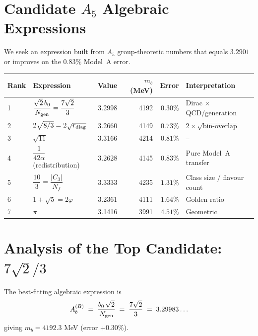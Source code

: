 \documentclass[11pt]{article}
\begin{document}
\section{Candidate $A_5$ Algebraic Expressions}

We seek an expression built from $A_5$ group-theoretic numbers that
equals $3.2901$ or improves on the $0.83\%$ Model~A error.

\medskip
\begin{center}
\begin{tabular}{llrrrl}
\toprule
Rank & Expression & Value & $m_b$ (MeV) & Error & Interpretation \\
\midrule
1 & $\dfrac{\sqrt{2}\,b_0}{N_{\rm gen}} = \dfrac{7\sqrt{2}}{3}$
  & 3.2998 & 4192 & $0.30\%$ & Dirac $\times$ QCD/generation \\[8pt]
2 & $2\sqrt{8/3} = 2\sqrt{r_{\rm diag}}$
  & 3.2660 & 4149 & $0.73\%$ & $2\times\sqrt{\text{bin-overlap}}$ \\[4pt]
3 & $\sqrt{11}$
  & 3.3166 & 4214 & $0.81\%$ & -- \\[2pt]
4 & $\dfrac{1}{42\alpha}$ (redistribution)
  & 3.2628 & 4145 & $0.83\%$ & Pure Model~A transfer \\[4pt]
5 & $\dfrac{10}{3} = \dfrac{|C_3|}{N_f}$
  & 3.3333 & 4235 & $1.31\%$ & Class size / flavour count \\[4pt]
6 & $1 + \sqrt{5} = 2\varphi$
  & 3.2361 & 4111 & $1.64\%$ & Golden ratio \\[4pt]
7 & $\pi$
  & 3.1416 & 3991 & $4.51\%$ & Geometric \\
\bottomrule
\end{tabular}
\end{center}

\section{Analysis of the Top Candidate: $7\sqrt{2}/3$}

The best-fitting algebraic expression is
\begin{equation}\label{eq:winner}
  A_b^{(B)} \;=\; \frac{b_0\,\sqrt{2}}{N_{\rm gen}}
  \;=\; \frac{7\sqrt{2}}{3}
  \;=\; 3.29983\ldots
\end{equation}
giving $m_b = 4192.3$ MeV (error $+0.30\%$).
\end{document}

